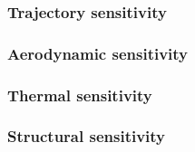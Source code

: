 
\subsubsection{Trajectory sensitivity}\label{subsec:orbitsens}


\subsubsection{Aerodynamic sensitivity}\label{subsec:aerosens}


%

\subsubsection{Thermal sensitivity}\label{subsec:thermalsens}


\subsubsection{Structural sensitivity}\label{subsec:strucsens}






